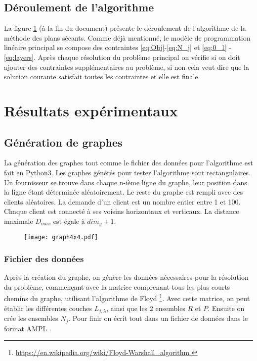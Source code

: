 \documentclass[letterpaper]{article}
\begin{document}
\subsection{Déroulement de l'algorithme}
La figure \ref{fig:algo} (à la fin du document) présente le déroulement de l'algorithme de la méthode des plans sécants. Comme déjà mentionné, le modèle de programmation linéaire principal se compose des contraintes \eqref{eq:Obj}-\eqref{eq:N_j} et \eqref{eq:0_1} -\eqref{eq:layers}. Après chaque résolution du problème principal on vérifie si on doit ajouter des contraintes supplémentaires au problème, si non cela veut dire que la solution courante satisfait toutes les contraintes et elle est finale.
\section{Résultats expérimentaux}
\subsection{Génération de graphes}
La génération des graphes tout comme le fichier des données pour l'algorithme est fait en Python3. Les graphes générés pour tester l'algorithme sont rectangulaires. Un fournisseur se trouve dans chaque n-ième ligne du graphe, leur position dans la ligne étant déterminée aléatoirement. Le reste du graphe est rempli avec des clients aléatoires. La demande d'un client est un nombre entier entre 1 et 100. Chaque client est connecté à ses voisins horizontaux et verticaux. La distance maximale $D_{max}$ est égale à $dim_{y}+1$.
\begin{figure}[h]
	\centering
	\texttt{[image: graph4x4.pdf]}
	\label{fig:algo}
\end{figure}
\subsubsection*{Fichier des données}
Après la création du graphe, on génère les données nécessaires pour la résolution du problème, commençant avec la matrice comprenant tous les plus courts chemins du graphe, utilisant l'algorithme de Floyd \footnote{\url{https://en.wikipedia.org/wiki/Floyd-Warshall_algorithm }}. Avec cette matrice, on peut établir les différentes couches $L_{j,\lambda}$, ainsi que les 2 ensembles $R$ et $P$. Ensuite on crée les ensembles $N_{j}$. Pour finir on écrit tout dans un fichier de données dans le format AMPL \citep*{AMPL}.
\end{document}
